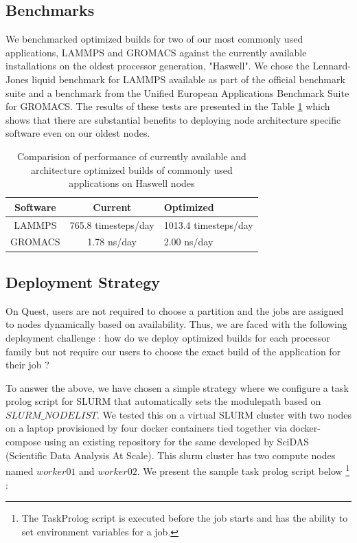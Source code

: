 \documentclass[sigconf,authordraft]{acmart}
\begin{document}
\subsection{Benchmarks}
We benchmarked optimized builds for two of our most commonly used applications, LAMMPS\cite{lammps} and GROMACS \cite{gromacs_1995,gromacs_2015} against the currently available installations on the oldest processor generation, "Haswell". We chose the Lennard-Jones liquid benchmark for LAMMPS available as part of the official benchmark suite \cite{lammps_bench} and a benchmark from the Unified European Applications Benchmark Suite \cite{ueabs_prace,ueabs_repo} for GROMACS. The results of these tests are presented in the Table \ref{tab:bench_apps} which shows that there are substantial benefits to deploying node architecture specific software even on our oldest nodes.

\begin{table}
	\caption{Comparision of performance of currently available and architecture optimized builds of commonly used applications on Haswell nodes}
	\label{tab:bench_apps}
	\begin{tabular}{ccl}
		\toprule
		Software &Current&Optimized\\
		\midrule
		LAMMPS & 765.8 timesteps/day&1013.4 timesteps/day\\
		GROMACS & 1.78 ns/day&2.00 ns/day\\
		\bottomrule
	\end{tabular}
\end{table}

\subsection{Deployment Strategy}
On Quest, users are not required to choose a partition and the jobs are assigned to nodes dynamically based on availability. Thus, we are faced with the following deployment challenge : how do we deploy optimized builds for each processor family but not require our users to choose the exact build of the application for their job ?

To answer the above, we have chosen a simple strategy where we configure a task prolog script for SLURM that automatically sets the modulepath based on $SLURM\_NODELIST$. We tested this on a virtual SLURM cluster with two nodes on a laptop provisioned by four docker containers tied together via docker-compose using an existing repository \cite{slurmdocker_repository} for the same developed by SciDAS (Scientific Data Analysis At Scale). This slurm cluster has two compute nodes named $worker01$ and $worker02$. We present the sample task prolog script below \footnote{The TaskProlog script is executed before the job starts and has the ability to set environment variables for a job.\cite{slurm_taskprolog}} : 
\end{document}
